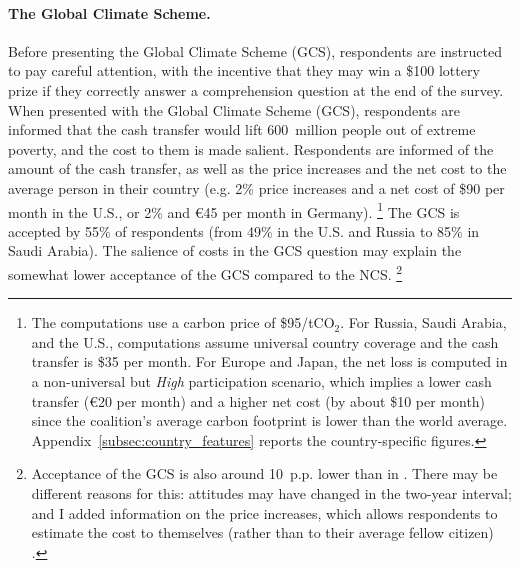\documentclass[12pt,english]{article}
\begin{document}
\begin{bibunit}
\paragraph{The Global Climate Scheme.} 
Before presenting the Global Climate Scheme (GCS), respondents are instructed to pay careful attention, with the incentive that they may win a \$100 lottery prize if they correctly answer a comprehension question at the end of the survey. 
When presented with the Global Climate Scheme (GCS), respondents are informed that the cash transfer would lift 600~million people out of extreme poverty, and the cost to them is made salient. Respondents are informed of the amount of the cash transfer, as well as the price increases and the net cost to the average person in their country (e.g. 2\% price increases and a net cost of \$90 per month in the U.S., or 2\% and \euro{}45 per month in Germany).%
\footnote{The computations use a carbon price of \$95/tCO$_\text{2}$. For Russia, Saudi Arabia, and the U.S., computations assume universal country coverage and the cash transfer is \$35 per month. 
For Europe and Japan, the net loss is computed in a non-universal but \textit{High} participation scenario, which implies a lower cash transfer (\euro{}20 per month) and a higher net cost (by about \$10 per month) since the coalition's average carbon footprint is lower than the world average. Appendix~\ref{subsec:country_features} reports the country-specific figures.} 
The GCS is accepted by 55\% of respondents (from 49\% in the U.S. and Russia to 85\% in Saudi Arabia). The salience of costs in the GCS question may explain the somewhat lower acceptance of the GCS compared to the NCS.%
\footnote{Acceptance of the GCS is also around 10~p.p. lower than in \cite{fabre_majority_2025}. There may be different reasons for this: attitudes may have changed in the two-year interval; and I added information on the price increases, which allows respondents to estimate the cost to themselves (rather than to their average fellow citizen)%
.} 


\end{bibunit}
\end{document}
